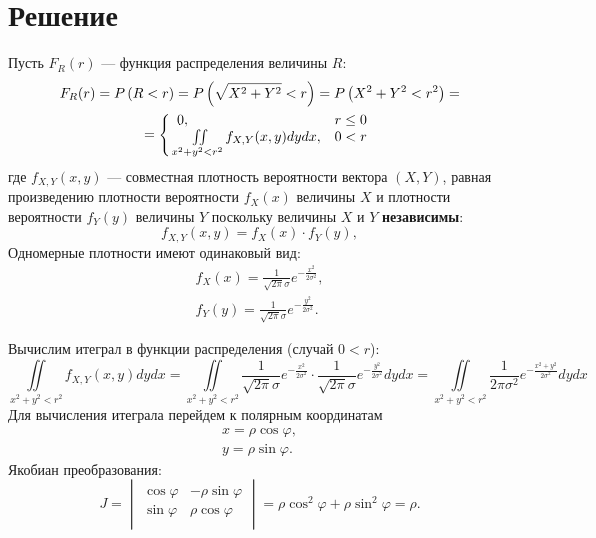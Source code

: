\documentclass[a4paper,12pt]{article}
\begin{document}
    \section*{Решение}
    Пусть $F_R(r)$ --- функция распределения величины $R$:
    \begin{multline}
        F_R(r)
        = P \left ( R < r \right )
        = P \left ( \sqrt{X^2 + Y^2} < r \right )
        = P \left ( X^2 + Y^2 < r^2 \right ) = \\
        = \left \{
        \begin{array}{ll}
            0,                                                   & r \le 0 \\
            \iint \limits_{x^2 + y^2 < r^2} f_{X,Y}(x, y) dy dx, & 0 < r   \\
        \end{array}
        \right .
    \end{multline}
    где $f_{X,Y}(x, y)$ --- совместная плотность вероятности вектора $\left ( X, Y \right )$, равная произведению плотности вероятности $f_X(x)$ величины $X$ и
    плотности вероятности $f_Y(y)$ величины $Y$ поскольку величины $X$ и $Y$ \textbf{независимы}:
    \begin{equation}
        f_{X,Y}(x, y) = f_X(x) \cdot f_Y(y),
    \end{equation}
    Одномерные плотности имеют одинаковый вид:
    \begin{gather}
        f_X(x) = \frac{1}{\sqrt{2 \pi} \sigma} e^{- \frac{x^2}{2 \sigma^2}} , \\
        f_Y(y) = \frac{1}{\sqrt{2 \pi} \sigma} e^{- \frac{y^2}{2 \sigma^2}} .
    \end{gather}

    Вычислим итеграл в функции распределения (случай $0 < r$):
    \begin{equation}
        \iint \limits_{x^2 + y^2 < r^2} f_{X,Y}(x, y) dy dx
        = \iint \limits_{x^2 + y^2 < r^2} \frac{1}{\sqrt{2 \pi} \sigma} e^{- \frac{x^2}{2 \sigma^2}} \cdot \frac{1}{\sqrt{2 \pi} \sigma} e^{- \frac{y^2}{2 \sigma^2}} dy dx
        = \iint \limits_{x^2 + y^2 < r^2} \frac{1}{2 \pi \sigma^2} e^{- \frac{x^2 + y^2}{2 \sigma^2}} dy dx
    \end{equation}
    Для вычисления итеграла перейдем к полярным координатам
    \begin{gather}
        x = \rho \cos \varphi , \\
        y = \rho \sin \varphi .
    \end{gather}
    Якобиан преобразования:
    \begin{equation}
        J
        = \begin{vmatrix}
              \cos \varphi & - \rho \sin \varphi \\
              \sin \varphi & \rho \cos \varphi   \\
        \end{vmatrix}
        = \rho \cos^2 \varphi + \rho \sin^2 \varphi = \rho
        .
    \end{equation}
\end{document}
